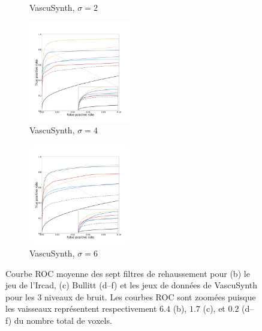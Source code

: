 \begin{figure}[!ht]
\begin{subfigure}[t]{\textwidth}
  \caption{VascuSynth, $\sigma = 2$}
\end{subfigure}
  \begin{subfigure}[t]{\textwidth}
  \includegraphics[clip = true, trim  =  125 125 100 200, width=44mm]{Images/Vascu_4_ROC.pdf}
  \caption{VascuSynth, $\sigma = 4$}
\end{subfigure}
  \begin{subfigure}[t]{\textwidth}
    \includegraphics[clip = true, trim  =  125 125 100 200, width=44mm]{Images/Vascu_6_ROC.pdf}
    \caption{VascuSynth, $\sigma = 6$}
\end{subfigure}
  \caption{
    Courbe ROC moyenne des sept filtres de rehaussement pour (b) le jeu de l'Ircad,  (c) Bullitt (d--f) et les jeux de données de VascuSynth pour les 3 niveaux de bruit.
    Les courbes ROC sont zoomées puisque les vaisseaux représentent respectivement $6.4$ \percent (b), $1.7$ \percent (c), et $0.2$ \percent (d--f) du nombre total de voxels.
    }
  \label{fig:Ircad_vascu_bullitt_ROC}
\end{figure}


